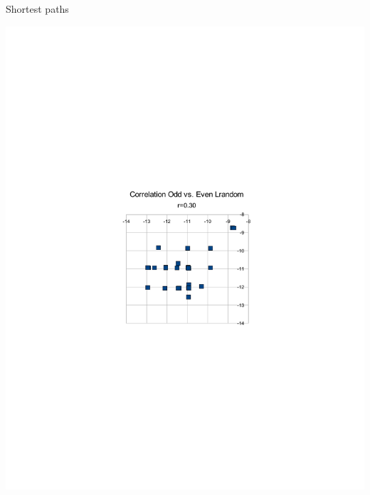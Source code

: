 \documentclass[xcolor=table,handout]{beamer}
\begin{document}
\begin{frame}{Shortest paths}
\centerline{
 \includegraphics[trim= 10cm 10cm 10cm 10cm,height=.9\textheight]{lrandom.pdf}}
\end{frame}
\end{document}
